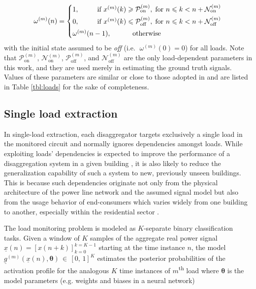 \documentclass[twocolumn,letter,10pt]{IEEEtran} %
\begin{document}
{\small\begin{equation*}
	\omega^{(m)}(n) =
	\begin{cases}
	1, & \hspace{-10mm}\text{if } x^{(m)}(k) \geqslant \mathcal{P}_{\text{on}}^{(m)}, \; \text{for } n \leqslant k < n+\mathcal{N}_{\text{on}}^{(m)}\\[1mm]
	0, & \hspace{-10mm}\text{if } x^{(m)}(k) \leqslant \mathcal{P}_{\text{off}}^{(m)}, \; \text{for } n \leqslant k < n+\mathcal{N}_{\text{off}}^{(m)}\\[1mm]
	\omega^{(m)}(n-1),	& \hspace{8mm} \text{otherwise}
	\end{cases}
	\end{equation*}}%
with the initial state assumed to be \emph{off} (i.e. $\;\omega^{(m)}(0) = 0$) for all loads. Note that $\mathcal{P}^{(m)}_{\text{on}}$, $\mathcal{N}^{(m)}_{\text{on}}$, $\mathcal{P}^{(m)}_{\text{off}}$, and $\mathcal{N}^{(m)}_{\text{off}}$ are the only load-dependent parameters in this work, and they are used merely in estimating the ground truth signals. Values of these parameters are similar or close to those adopted in \cite{Kelly_2015} and are listed in Table \ref{tbl:loads} for the sake of completeness.

\subsection{Single load extraction}

In single-load extraction, each disaggregator targets exclusively a single load in the monitored circuit and normally ignores dependencies amongst loads. While exploiting loads' dependencies is expected to improve the performance of a disaggregation system in a given building \cite{Kim_2010, Kolter_2010_SparseCoding, Makonin_2014_PhD}, it is also likely to reduce the generalization capability of such a system to new, previously unseen buildings. This is because such dependencies originate not only from the physical architecture of the power line network and the assumed signal model but also from the usage behavior of end-consumers which varies widely from one building to another, especially within the residential sector \cite{Batra_2014_Comparison}.

The load monitoring problem is modeled as $K$-separate binary classification tasks. Given a window of $K$ samples of the aggregate real power signal $\underline{x}(n) = \left[x(n + k)\right]_{k=0}^{k=K-1}$ starting at the time instance $n$, the model $\underline{g}^{(m)}(\underline{x}(n), \bm{\theta})\,\in\,[0,\,1]^K$ estimates the posterior probabilities of the activation profile for the analogous $K$ time instances of $m$\textsuperscript{th} load where $\bm{\theta}$ is the model parameters (e.g. weights and biases in a neural network)
\end{document}
